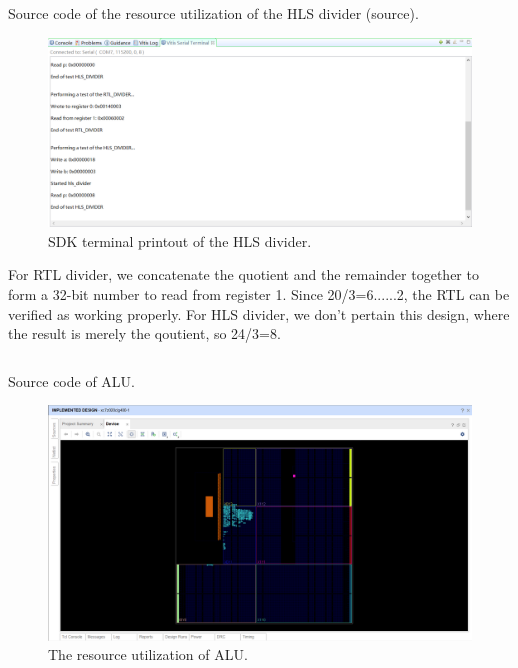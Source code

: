 \documentclass[a4paper]{article}
\begin{document}
\begin{listing}[H]
\inputminted[frame=single,bgcolor=bg,breaklines,linenos]{cpp}{hls_divider.cpp}
\caption{Source code of the resource utilization of the HLS divider (source).}
\end{listing}
\begin{figure}[H]
    \centering
    \includegraphics[width=1\textwidth]{3.png}
    \caption{SDK terminal printout of the HLS divider.}
\end{figure}
For RTL divider, we concatenate the quotient and the remainder together to form a 32-bit number to read from register 1. Since 20/3=6......2, the RTL can be verified as working properly. For HLS divider, we don't pertain this design, where the result is merely the qoutient, so 24/3=8.
\begin{listing}[H]
\inputminted[frame=single,bgcolor=bg,breaklines,linenos]{cpp}{hls_ALU.cpp}
\caption{Source code of ALU.}
\end{listing}
\begin{figure}[H]
    \centering
    \includegraphics[width=1\textwidth]{4.png}
    \caption{The resource utilization of ALU.}
\end{figure}
\end{document}
